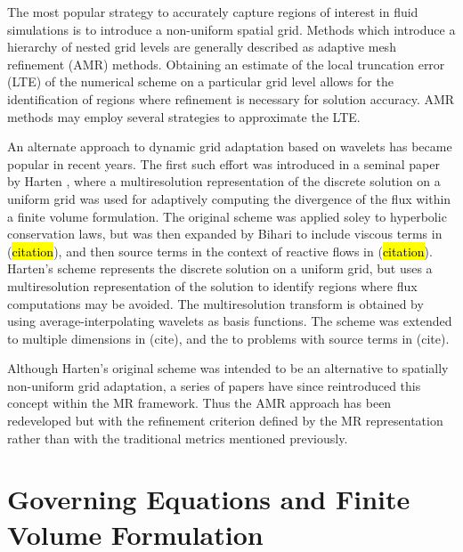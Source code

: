 \documentclass[12pt,letterpaper]{article}
\begin{document}
    The most popular strategy to accurately capture regions of interest in fluid
    simulations is to introduce a non-uniform spatial grid.  Methods which
    introduce a hierarchy of nested grid levels are generally described as
    adaptive mesh refinement (AMR) methods. Obtaining an estimate of the local
    truncation error (LTE) of the numerical scheme on a particular grid
    level allows for the identification of regions where refinement is necessary
    for solution accuracy. AMR methods may employ several strategies to
    approximate the LTE. 

    An alternate approach to dynamic grid adaptation based on wavelets has became
    popular in recent years. The first such effort was introduced in a seminal
    paper by Harten \cite{harten1994}, where a multiresolution representation of
    the discrete solution on a uniform grid was used for adaptively computing the
    divergence of the flux within a finite volume formulation. The original
    scheme was applied soley to hyperbolic conservation laws, but was then
    expanded by Bihari to include viscous terms in (\hl{citation}), and then source
    terms in the context of reactive flows in (\hl{citation}). Harten's scheme
    represents the discrete solution on a uniform grid, but uses a
    multiresolution representation of the solution to identify regions where
    flux computations may be avoided. The multiresolution transform is obtained
    by using average-interpolating wavelets as basis functions. The scheme was
    extended to multiple dimensions in (cite), and the to problems with source
    terms in (cite).

    Although Harten's original scheme was intended to be an alternative to
    spatially non-uniform grid adaptation, a series of papers have
    since reintroduced this concept within the MR framework. Thus the AMR
    approach has been redeveloped but with the refinement criterion defined by
    the MR representation rather than with the traditional metrics mentioned
    previously.


\section{Governing Equations and Finite Volume Formulation}
\end{document}
